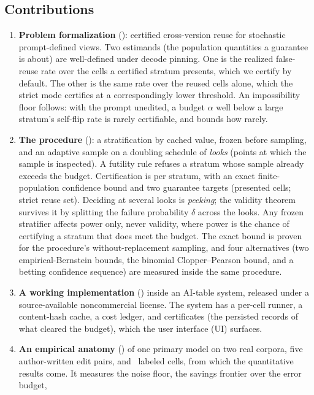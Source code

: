 \subsection{Contributions}
\begin{enumerate}
\item \textbf{Problem formalization} (): certified
cross-version reuse for stochastic prompt-defined views. Two estimands
(the population quantities a guarantee is about) are well-defined under
decode pinning. One is the realized false-reuse rate over the cells a
certified stratum presents, which we certify by default. The other is
the same rate over the reused cells alone, which the strict mode
certifies at a correspondingly lower threshold. An impossibility floor
follows: with the prompt unedited, a budget $\alpha$ well below a
large stratum's self-flip rate is rarely certifiable, and
 bounds how rarely.
\item \textbf{The \sivm{} procedure} (): a stratification by cached value,
frozen before sampling, and an adaptive sample on a doubling schedule of
\emph{looks} (points at which the sample is inspected). A futility rule
refuses a stratum whose sample already exceeds the budget.
Certification is per stratum, with an exact finite-population confidence
bound and two guarantee targets (presented cells; strict reuse set).
Deciding at several looks is \emph{peeking}; the validity theorem
survives it by splitting the failure probability $\delta$ across the
looks. Any frozen stratifier affects power only, never validity, where
power is the chance of certifying a stratum that does meet the budget. The exact bound is
proven for the procedure's without-replacement sampling, and
four alternatives (two empirical-Bernstein bounds, the binomial
Clopper--Pearson bound, and a betting confidence sequence) are measured
inside the same procedure.
\item \textbf{A working implementation} () inside an
AI-table system, released under a source-available noncommercial
license. The system has a per-cell runner, a content-hash cache, a cost
ledger, and certificates (the persisted records of what cleared the
budget), which the user interface (UI) surfaces.
\item \textbf{An empirical anatomy} () of one
primary model on two real corpora, five author-written edit pairs, and
\ labeled cells, from which the quantitative results come.
It measures the noise floor, the savings frontier over the error budget,

\end{enumerate}
